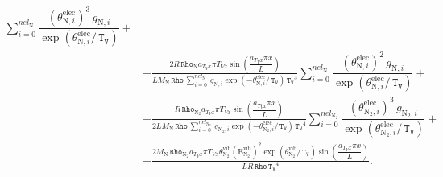 \documentclass[10pt]{article}
\newcommand{\Rho}{\,\mathtt{Rho}}
\newcommand{\TV}{\,\mathtt{T_V}}
\newcommand{\N}{\text{N}}
\newcommand{\elec}{\text{elec}}
\newcommand{\vib}{\text{vib}}
\newcommand{\E}{\text{E}}
\newcommand{\eelecNden}{\,\sum_{i=0}^{nel_{\N}}   \, g_{\N,i}   \exp \left( -\theta^{\elec}_{\N,i} / \TV  \right) }
\newcommand{\eelecNdoisden}{\,\sum_{i=0}^{nel_{\N_2}}  \, g_{\N_2,i}   \exp \left( -\theta^{\elec}_{\N_2,i} /  \TV \right)}
\begin{document}
\begin{equation*}
\begin{split}
\sum_{i=0}^{nel_{\N}} \dfrac{ \left( \theta^{\elec}_{\N,i} \right)^3   \, g_{\N,i} }{ \exp \left( \theta^{\elec}_{\N,i} / \TV
\right)}+\\
%
&+ \frac{2 R \Rho_{\N} a_{T_V x} \pi T_{Vx} \sin\left(\dfrac{a_{T_V x} \pi x}{L}\right)}{L M_{\N} \Rho \eelecNden \TV^{3}}
\sum_{i=0}^{nel_{\N}} \dfrac{ \left( \theta^{\elec}_{\N,i} \right)^2   \, g_{\N,i} }{ \exp \left( \theta^{\elec}_{\N,i} / \TV
\right)}+\\
%
&- \frac{R \Rho_{\N_2} a_{T_V x} \pi T_{Vx} \sin\left(\dfrac{a_{T_V x} \pi x}{L}\right)}{2 L M_{\N} \Rho \eelecNdoisden \TV^{4}} 
\sum_{i=0}^{nel_{\N_2}} \dfrac{ \left( \theta^{\elec}_{\N_2,i} \right)^3   \, g_{\N_2,i} }{ \exp \left( \theta^{\elec}_{\N_2,i} / 
\TV \right)} +\\
%
&+ \frac{2 M_{\N} \Rho_{\N_2} a_{T_V x} \pi T_{Vx} \theta^{\vib}_{\N_2} \left( \E^{\vib}_{\N_2} \right)^2 \exp\left(
\theta^{\vib}_{\N_2} / \TV \right) \sin\left(\dfrac{a_{T_V x} \pi x}{L}\right)}{L R \Rho \TV^{4}}.
 \end{split}
\end{equation*}
\end{document}
